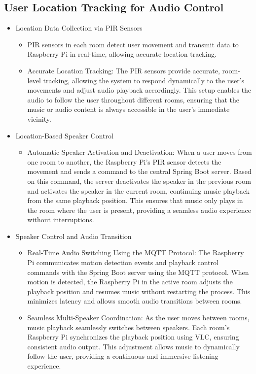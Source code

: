 \documentclass[conference]{IEEEtran}
\begin{document}
\subsection{User Location Tracking for Audio Control}
\begin{itemize}
    \item Location Data Collection via PIR Sensors
\begin{itemize}
    \item PIR sensors in each room detect user movement and transmit data to Raspberry Pi in real-time, allowing accurate location tracking.\\
    \item Accurate Location Tracking: The PIR sensors provide accurate, room-level tracking, allowing the system to respond dynamically to the user’s movements and adjust audio playback accordingly. This setup enables the audio to follow the user throughout different rooms, ensuring that the music or audio content is always accessible in the user’s immediate vicinity.\\
\end{itemize}
\end{itemize}
\begin{itemize}
    \item Location-Based Speaker Control
\begin{itemize}
    \item Automatic Speaker Activation and Deactivation:
When a user moves from one room to another, the Raspberry Pi's PIR sensor detects the movement and sends a command to the central Spring Boot server. Based on this command, the server deactivates the speaker in the previous room and activates the speaker in the current room, continuing music playback from the same playback position. This ensures that music only plays in the room where the user is present, providing a seamless audio experience without interruptions.\\
\end{itemize}
\end{itemize}
\begin{itemize}
    \item Speaker Control and Audio Transition
\begin{itemize}
    \item Real-Time Audio Switching Using the MQTT Protocol:
The Raspberry Pi communicates motion detection events and playback control commands with the Spring Boot server using the MQTT protocol. When motion is detected, the Raspberry Pi in the active room adjusts the playback position and resumes music without restarting the process. This minimizes latency and allows smooth audio transitions between rooms.\\
    \item Seamless Multi-Speaker Coordination:
As the user moves between rooms, music playback seamlessly switches between speakers. Each room’s Raspberry Pi synchronizes the playback position using VLC, ensuring consistent audio output. This adjustment allows music to dynamically follow the user, providing a continuous and immersive listening experience.\\
\end{itemize}
\end{itemize}
\end{document}
